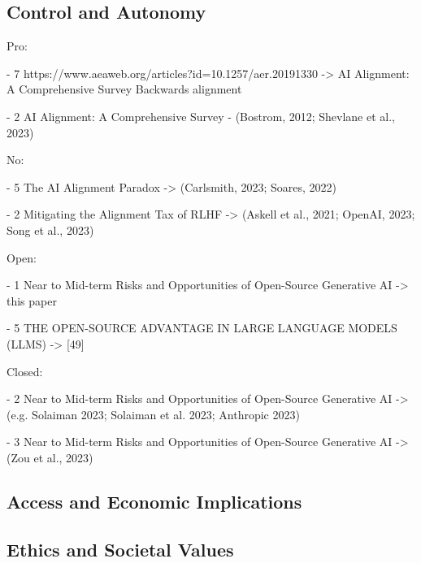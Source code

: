 \subsection{Control and Autonomy}

Pro:

- 7 https://www.aeaweb.org/articles?id=10.1257/aer.20191330 -> AI Alignment: A Comprehensive Survey
Backwards alignment

- 2 AI Alignment: A Comprehensive Survey - (Bostrom, 2012; Shevlane et al., 2023)

No:

- 5 The AI Alignment Paradox -> (Carlsmith, 2023; Soares, 2022)

- 2 Mitigating the Alignment Tax of RLHF -> (Askell et al., 2021; OpenAI, 2023; Song et al., 2023)

Open: 

- 1 Near to Mid-term Risks and Opportunities of Open-Source Generative AI -> this paper

- 5 THE OPEN-SOURCE ADVANTAGE IN LARGE LANGUAGE MODELS (LLMS) -> [49]

Closed:

- 2 Near to Mid-term Risks and Opportunities of Open-Source Generative AI -> (e.g. Solaiman 2023; Solaiman et al. 2023; Anthropic 2023)

- 3 Near to Mid-term Risks and Opportunities of Open-Source Generative AI -> (Zou et al., 2023)

\subsection{Access and Economic Implications}

\subsection{Ethics and Societal Values}
